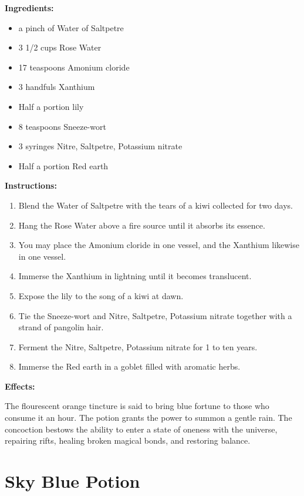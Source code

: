\documentclass{article}
\begin{document}
\textbf{Ingredients:}

\begin{itemize}
  \item a pinch of Water of Saltpetre
  \item 3 1/2 cups Rose Water
  \item 17 teaspoons Amonium cloride
  \item 3 handfuls Xanthium
  \item Half a portion lily
  \item 8 teaspoons Sneeze-wort
  \item 3 syringes Nitre, Saltpetre, Potassium nitrate
  \item Half a portion Red earth
\end{itemize}

\textbf{Instructions:}

\begin{enumerate}
  \item Blend the Water of Saltpetre with the tears of a kiwi collected for two days.
  \item Hang the Rose Water above a fire source until it absorbs its essence.
  \item You may place the Amonium cloride in one vessel, and the Xanthium likewise in one vessel.
  \item Immerse the Xanthium in lightning until it becomes translucent.
  \item Expose the lily to the song of a kiwi at dawn.
  \item Tie the Sneeze-wort and Nitre, Saltpetre, Potassium nitrate together with a strand of pangolin hair.
  \item Ferment the Nitre, Saltpetre, Potassium nitrate for 1 to ten years.
  \item Immerse the Red earth in a goblet filled with aromatic herbs.
\end{enumerate}

\textbf{Effects:}

The flourescent orange tincture is said to bring blue fortune to those who consume it an hour. The potion grants the power to summon a gentle rain. The concoction bestows the ability to enter a state of oneness with the universe, repairing rifts, healing broken magical bonds, and restoring balance.

\newpage
\section*{Sky Blue Potion}
\end{document}
